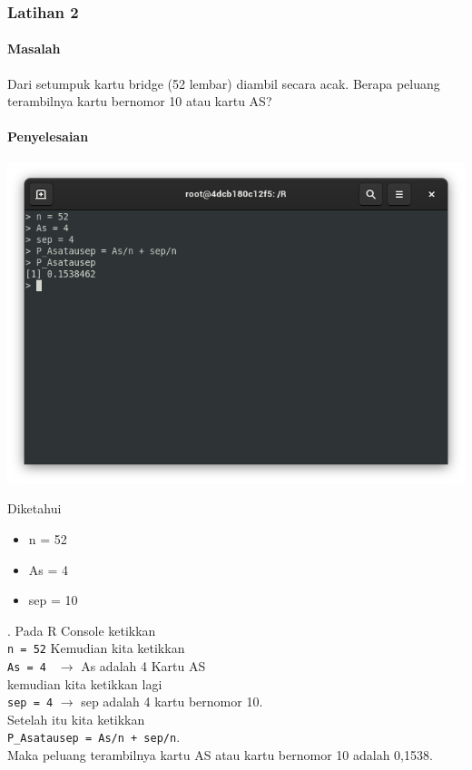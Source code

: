 \documentclass[a4paper,12pt]{article}
\begin{document}
\subsubsection{Latihan 2}
\paragraph{Masalah\\}
Dari setumpuk kartu bridge (52 lembar) diambil secara acak. Berapa peluang terambilnya kartu bernomor 10 atau kartu AS?
\paragraph{Penyelesaian\\}
\begin{center}
	\includegraphics[scale=.5]{lat2}
\end{center}

Diketahui 
\begin{itemize}
	\item n = 52 
	\item As = 4 
	\item sep = 10
\end{itemize}. 
Pada R Console ketikkan 
\\\texttt{n = 52}
Kemudian kita ketikkan\\ 
\texttt{As = 4 } $\rightarrow$ As adalah 4 Kartu AS \\
kemudian kita ketikkan lagi\\ 
\texttt{sep = 4} $\rightarrow$ sep adalah 4 kartu bernomor 10.\\ 
Setelah itu kita ketikkan  \\
\texttt{P\_Asatausep = As/n + sep/n}.\\ 
Maka peluang terambilnya kartu AS atau kartu bernomor 10 adalah 0,1538.
\end{document}
